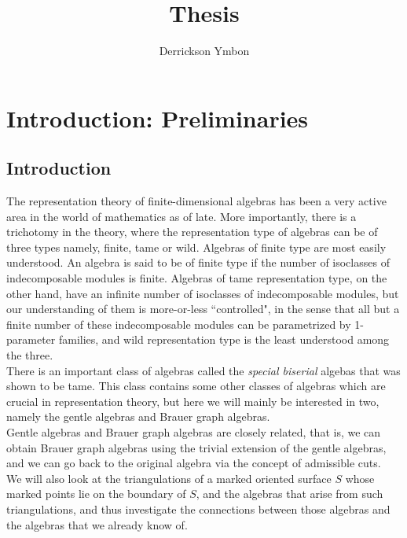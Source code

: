 \documentclass{report}
\title{Thesis}
\author{Derrickson Ymbon}
\theoremstyle{definition}
\numberwithin{figure}{section}
\begin{document}
\maketitle
\section{Introduction: Preliminaries}

\subsection{Introduction}
The representation theory of finite-dimensional algebras has been a very active area in the world of mathematics as of late. More importantly, there is a trichotomy in the theory, where the representation type of algebras can be of three types namely, finite, tame or wild. Algebras of finite type are most easily understood. An algebra is said to be of finite type if the number of isoclasses of indecomposable modules is finite. Algebras of tame representation type, on the other hand, have an infinite number of isoclasses of indecomposable modules, but our understanding of them is more-or-less ``controlled", in the sense that all but a finite number of these indecomposable modules can be parametrized by 1-parameter families, and wild representation type is the least understood among the three.\\ 

There is an important class of algebras called the \textit{special biserial} algebas that was shown to be tame\cite{Wald1985TameBA, waschbusch1983representation}. This class contains some other classes of algebras which are crucial in representation theory, but here we will mainly be interested in two, namely the gentle algebras and Brauer graph algebras\cite{schroll2017brauergraphalgebras}.\\
Gentle algebras and Brauer graph algebras are closely related, that is, we can obtain Brauer graph algebras using the trivial extension of the gentle algebras, and we can go back to the original algebra via the concept of admissible cuts.\cite{schroll2015trivialextensionsgentlealgebras} \\

We will also look at the triangulations of a marked oriented surface $S$ whose marked points lie on the boundary of $S$, and the algebras that arise from such triangulations, and thus investigate the connections between those algebras and the algebras that we already know of\cite{assem2009gentlealgebrasarisingsurface}.\\ 
\end{document}
